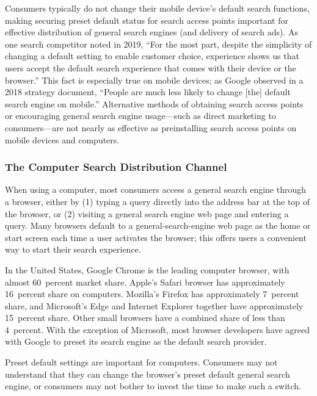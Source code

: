 \documentclass[11pt,b5paper,headings=small]{scrartcl}
\begin{document}

Consumers typically do not change their mobile device’s default search functions,
making securing preset default status for search access points important for effective distribution
of general search engines (and delivery of search ads). As one search competitor noted in 2019,
“For the most part, despite the simplicity of changing a default setting to enable customer choice,
experience shows us that users accept the default search experience that comes with their device
or the browser.” This fact is especially true on mobile devices; as Google observed in a 2018
strategy document, “People are much less likely to change [the] default search engine on
mobile.” Alternative methods of obtaining search access points or encouraging general search
engine usage—such as direct marketing to consumers—are not nearly as effective as
preinstalling search access points on mobile devices and computers.




\subsubsection{The Computer Search Distribution Channel}
When using a computer, most consumers access a general search engine through a
browser, either by (1) typing a query directly into the address bar at the top of the browser, or
(2) visiting a general search engine web page and entering a query. Many browsers default to a
general-search-engine web page as the home or start screen each time a user activates the
browser; this offers users a convenient way to start their search experience.


In the United States, Google Chrome is the leading computer browser, with
almost 60~percent market share. Apple’s Safari browser has approximately 16~percent share on
computers. Mozilla’s Firefox has approximately 7~percent share, and Microsoft’s Edge and
Internet Explorer together have approximately 15~percent share. Other small browsers have a
combined share of less than 4~percent. With the exception of Microsoft, most browser developers
have agreed with Google to preset its search engine as the default search provider.


Preset default settings are important for computers. Consumers may not
understand that they can change the browser’s preset default general search engine, or consumers
may not bother to invest the time to make such a switch.
\end{document}
